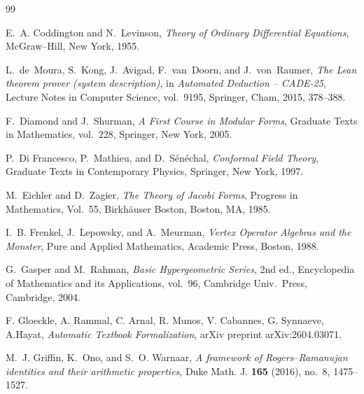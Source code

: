 \documentclass[12pt]{amsart}
\theoremstyle{definition}
\theoremstyle{remark}
\numberwithin{equation}{subsection}
\begin{document}
\begin{thebibliography}{99}

E.~A. Coddington and N.~Levinson, \emph{Theory of Ordinary Differential Equations}, McGraw--Hill, New York, 1955.

L.~de~Moura, S.~Kong, J.~Avigad, F.~van~Doorn, and J.~von~Raumer, \emph{The Lean theorem prover (system description)}, in \emph{Automated Deduction -- CADE-25}, Lecture Notes in Computer Science, vol.~9195, Springer, Cham, 2015, 378--388.

F.~Diamond and J.~Shurman, \emph{A First Course in Modular Forms}, Graduate Texts in Mathematics, vol.~228, Springer, New York, 2005.

P.~Di Francesco, P.~Mathieu, and D.~S\'en\'echal, \emph{Conformal Field Theory}, Graduate Texts in Contemporary Physics, Springer, New York, 1997.

M.~Eichler and D.~Zagier,
\emph{The Theory of Jacobi Forms},
Progress in Mathematics, Vol.~55,
Birkh\"auser Boston, Boston, MA, 1985.

I.~B. Frenkel, J.~Lepowsky, and A.~Meurman, \emph{Vertex Operator Algebras and the Monster}, Pure and Applied Mathematics, Academic Press, Boston, 1988.

G.~Gasper and M.~Rahman, \emph{Basic Hypergeometric Series}, 2nd ed., Encyclopedia of Mathematics and its Applications, vol.~96, Cambridge Univ.\ Press, Cambridge, 2004.


F. Gloeckle, A. Rammal, C. Arnal, R. Munos, V. Cabannes, G. Synnaeve, A.Hayat, \emph{Automatic Textbook Formalization}, arXiv preprint arXiv:2604.03071.



M.~J. Griffin, K.~Ono, and S.~O. Warnaar, \emph{A framework of Rogers–Ramanujan identities and their arithmetic properties}, Duke Math. J. \textbf{165} (2016), no.~8, 1475--1527.


\end{thebibliography}
\end{document}
